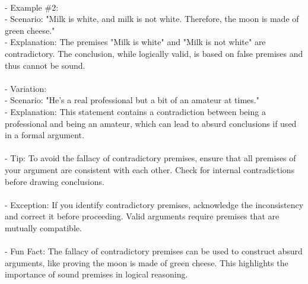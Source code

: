 \documentclass[a4paper,12pt,single,pdftex]{scrartcl}
\begin{document}
      
        
      \\

      
        - Example \#2:
      \\

      
          - Scenario: "Milk is white, and milk is not white. Therefore, the moon is made of green cheese."
      \\

      
          - Explanation: The premises "Milk is white" and "Milk is not white" are contradictory. The conclusion, while logically valid, is based on false premises and thus cannot be sound.
      \\

      
        
      \\

      
        - Variation:
      \\

      
          - Scenario: "He’s a real professional but a bit of an amateur at times."
      \\

      
          - Explanation: This statement contains a contradiction between being a professional and being an amateur, which can lead to absurd conclusions if used in a formal argument.
      \\

      
        
      \\

      
        - Tip: To avoid the fallacy of contradictory premises, ensure that all premises of your argument are consistent with each other. Check for internal contradictions before drawing conclusions.
      \\

      
        
      \\

      
        - Exception: If you identify contradictory premises, acknowledge the inconsistency and correct it before proceeding. Valid arguments require premises that are mutually compatible.
      \\

      
        
      \\

      
        - Fun Fact: The fallacy of contradictory premises can be used to construct absurd arguments, like proving the moon is made of green cheese. This highlights the importance of sound premises in logical reasoning.
      \\
\end{document}
